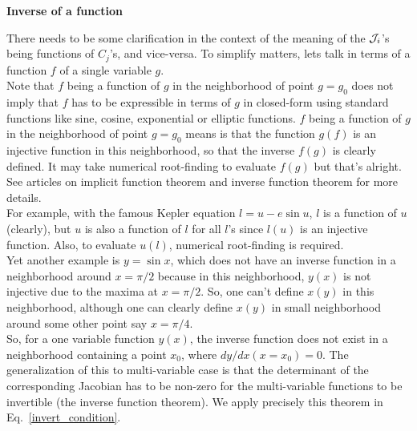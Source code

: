 \begin{definition}[label=def:C1]

\begin{center}
\textbf{Inverse of a function}
\end{center}

There needs to be some clarification in the context of 
the meaning of the $\mathcal{J}_i$'s being functions of $C_j$'s, 
and vice-versa. To simplify matters, lets talk in terms of 
a function $f$ of  a single variable $g$.\\


Note that $f$ being  a function of $g$ in the neighborhood
of point $g=g_0$ does not imply that 
$f$ has to be expressible in terms of $g$ in closed-form
using standard functions like sine, cosine, exponential or elliptic functions.
$f$ being  a function of $g$ in the neighborhood
of point $g=g_0$ means is that the function
$g(f)$ is an injective function in this neighborhood, so that
the inverse $f(g)$ is clearly defined. It may take numerical
root-finding to evaluate $f(g)$ but that's alright. 
See articles on implicit function theorem and inverse 
function theorem for more details. \\



For example, with the famous Kepler equation $l = u - e \sin u$,
$l$ is a function of $u$ (clearly), but $u$ is also a function of $l$
for all $l$'s since $l(u)$ is an injective function. Also, 
to evaluate $u(l)$, numerical root-finding is required. \\


Yet another example is $y= \sin x$, which does not have an inverse function
in a neighborhood around $x= \pi/2$ because in this neighborhood, 
$y(x)$ is not injective due to the maxima at $x= \pi/2$. So, one can't 
define $x(y)$ in this neighborhood, although one can clearly define 
$x(y)$ in small neighborhood around some other point say $x = \pi/4$.\\


So, for a one variable function $y(x)$,
 the inverse function does not exist in a 
neighborhood containing  a point $x_0$, where $dy/dx(x=x_0) = 0$. The 
generalization of this to multi-variable case is that the determinant
of the corresponding Jacobian has to be non-zero for the multi-variable
functions to be invertible (the inverse function theorem).
We apply precisely this theorem in Eq.~\eqref{invert_condition}.


\end{definition}

